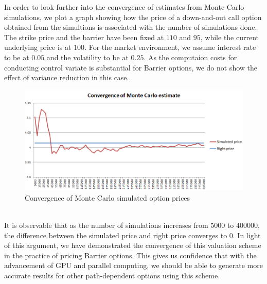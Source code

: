 In order to look further into the convergence of estimates from Monte Carlo simulations, we plot a graph showing how the price of a down-and-out call option obtained from the simultions is associated with the number of simulations done. The strike price and the barrier have been fixed at $110$ and $95$, while the current underlying price is at $100$. For the market environment, we assume interest rate to be at $0.05$ and the volatility to be at $0.25$. As the computaion costs for conducting control variate is substantial for Barrier options, we do not show the effect of variance reduction in this case.
\begin{figure}[h]
      \centering
	\includegraphics[scale=0.45]{barrierMonteCarloConvergence.png}
      \caption{Convergence of Monte Carlo simulated option prices}
\end{figure}
\\It is observable that as the number of simulations increases from $5000$ to $400000$, the difference between the simulated price and right price converges to 0. In light of this argument, we have demonstrated the convergence of this valuation scheme in the practice of pricing Barrier options. This gives us confidence that with the advancement of GPU and parallel computing, we should be able to generate more accurate results for other path-dependent options using this scheme.
\newpage

